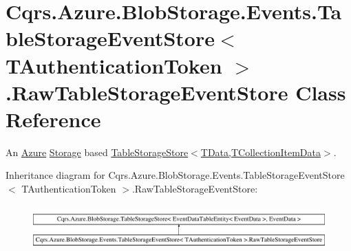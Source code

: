\hypertarget{classCqrs_1_1Azure_1_1BlobStorage_1_1Events_1_1TableStorageEventStore_1_1RawTableStorageEventStore}{}\section{Cqrs.\+Azure.\+Blob\+Storage.\+Events.\+Table\+Storage\+Event\+Store$<$ T\+Authentication\+Token $>$.Raw\+Table\+Storage\+Event\+Store Class Reference}
\label{classCqrs_1_1Azure_1_1BlobStorage_1_1Events_1_1TableStorageEventStore_1_1RawTableStorageEventStore}


An \hyperlink{namespaceCqrs_1_1Azure}{Azure} \hyperlink{namespaceCqrs_1_1Azure_1_1Storage}{Storage} based \hyperlink{classCqrs_1_1Azure_1_1BlobStorage_1_1TableStorageStore_aabc36bc46ffb22b716cc7769a641cfab_aabc36bc46ffb22b716cc7769a641cfab}{Table\+Storage\+Store$<$\+T\+Data,\+T\+Collection\+Item\+Data$>$}.  


Inheritance diagram for Cqrs.\+Azure.\+Blob\+Storage.\+Events.\+Table\+Storage\+Event\+Store$<$ T\+Authentication\+Token $>$.Raw\+Table\+Storage\+Event\+Store\+:\begin{figure}[H]
\begin{center}
\leavevmode
\includegraphics[height=1.723077cm]{classCqrs_1_1Azure_1_1BlobStorage_1_1Events_1_1TableStorageEventStore_1_1RawTableStorageEventStore}
\end{center}
\end{figure}
